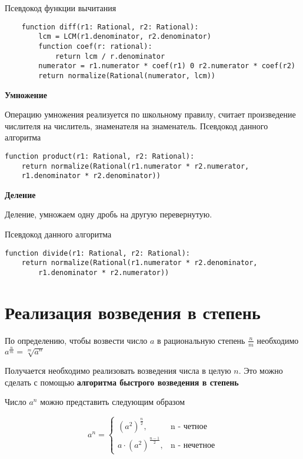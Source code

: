 \documentclass[a4paper,article,14pt]{extarticle}
\begin{document}
Псевдокод функции вычитания

\begin{lstlisting}
    function diff(r1: Rational, r2: Rational):
        lcm = LCM(r1.denominator, r2.denominator)
        function coef(r: rational):
            return lcm / r.denominator
        numerator = r1.numerator * coef(r1) 0 r2.numerator * coef(r2)
        return normalize(Rational(numerator, lcm))
\end{lstlisting}

\textbf{Умножение}

Операцию умножения реализуется по школьному правилу, 
считает произведение числителя на числитель, знаменателя на знаменатель.
Псевдокод данного алгоритма

\begin{lstlisting}
function product(r1: Rational, r2: Rational):
    return normalize(Rational(r1.numerator * r2.numerator, 
    r1.denominator * r2.denominator))
\end{lstlisting}

\textbf{Деление}

Деление, умножаем одну дробь на другую перевернутую.

Псевдокод данного алгоритма
\begin{lstlisting}
function divide(r1: Rational, r2: Rational):
    return normalize(Rational(r1.numerator * r2.denominator,
        r1.denominator * r2.numerator))
\end{lstlisting}

\newpage


\section{Реализация возведения в степень}

По определению, чтобы возвести число $a$ в 
рациональную степень $ \frac{n}{m} $ необходимо
$ a^{\frac{n}{m}} = \sqrt[m]{a^n} $

Получается необходимо реализовать возведения числа в целую $n$. 
Это можно сделать с помощью \textbf{алгоритма быстрого возведения в степень} \cite{2}

Число $a^n$ можно представить следующим образом

\begin{equation}
    a ^ n = 
\begin{cases}
    (a^2)^{\frac{n}{2}}, & \text{n - четное} \\
    a \cdot (a^2)^{\frac{n - 1}{2}}, & \text{n - нечетное}
\end{cases}
\end{equation}
\end{document}

